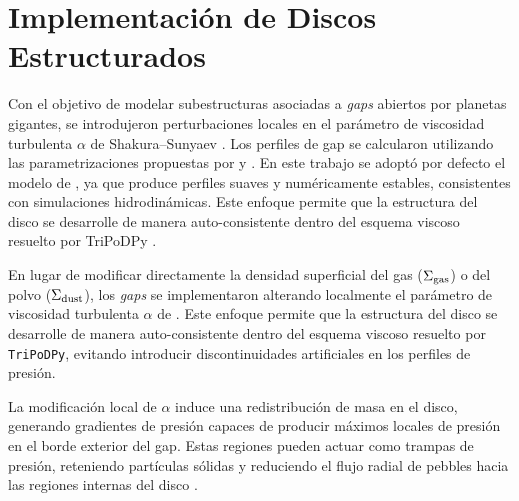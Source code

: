 \section{Implementación de Discos Estructurados}

Con el objetivo de modelar subestructuras asociadas a \textit{gaps} abiertos por planetas gigantes, se introdujeron perturbaciones locales en el parámetro de viscosidad turbulenta $\alpha$ de Shakura--Sunyaev \citep{Shakura_sunyaev_1973}. Los perfiles de gap se calcularon utilizando las parametrizaciones propuestas por \citet{Kanagawa2016} y \citet{Duffell2020}. En este trabajo se adoptó por defecto el modelo de \citet{Duffell2020}, ya que produce perfiles suaves y numéricamente estables, consistentes con simulaciones hidrodinámicas. Este enfoque permite que la estructura del disco se desarrolle de manera auto-consistente dentro del esquema viscoso resuelto por TriPoDPy \citep{Pfeil2024_teoria,Kaufmann2025}.



En lugar de modificar directamente la densidad superficial del gas ($\Sigma_{\rm gas}$) o del polvo ($\Sigma_{\rm dust}$), los \textit{gaps} se implementaron alterando localmente el parámetro de viscosidad turbulenta $\alpha$ de  \citet{Shakura_sunyaev_1973}. Este enfoque permite que la estructura del disco se desarrolle de manera auto-consistente dentro del esquema viscoso resuelto por \texttt{TriPoDPy}, evitando introducir discontinuidades artificiales en los perfiles de presión.


La modificación local de $\alpha$ induce una redistribución de masa en el disco, generando gradientes de presión capaces de producir máximos locales de presión en el borde exterior del gap. Estas regiones pueden actuar como trampas de presión, reteniendo partículas sólidas y reduciendo el flujo radial de pebbles hacia las regiones internas del disco \citep{Pinilla2012, Kanagawa2016, Duffell2020}.

